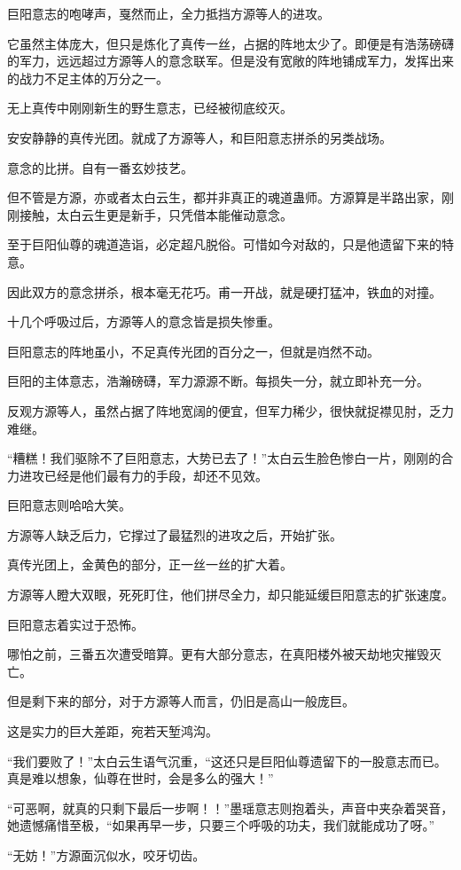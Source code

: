 \begin{this_body}
巨阳意志的咆哮声，戛然而止，全力抵挡方源等人的进攻。

它虽然主体庞大，但只是炼化了真传一丝，占据的阵地太少了。即便是有浩荡磅礴的军力，远远超过方源等人的意念联军。但是没有宽敞的阵地铺成军力，发挥出来的战力不足主体的万分之一。

无上真传中刚刚新生的野生意志，已经被彻底绞灭。

安安静静的真传光团。就成了方源等人，和巨阳意志拼杀的另类战场。

意念的比拼。自有一番玄妙技艺。

但不管是方源，亦或者太白云生，都并非真正的魂道蛊师。方源算是半路出家，刚刚接触，太白云生更是新手，只凭借本能催动意念。

至于巨阳仙尊的魂道造诣，必定超凡脱俗。可惜如今对敌的，只是他遗留下来的特意。

因此双方的意念拼杀，根本毫无花巧。甫一开战，就是硬打猛冲，铁血的对撞。

十几个呼吸过后，方源等人的意念皆是损失惨重。

巨阳意志的阵地虽小，不足真传光团的百分之一，但就是岿然不动。

巨阳的主体意志，浩瀚磅礴，军力源源不断。每损失一分，就立即补充一分。

反观方源等人，虽然占据了阵地宽阔的便宜，但军力稀少，很快就捉襟见肘，乏力难继。

“糟糕！我们驱除不了巨阳意志，大势已去了！”太白云生脸色惨白一片，刚刚的合力进攻已经是他们最有力的手段，却还不见效。

巨阳意志则哈哈大笑。

方源等人缺乏后力，它撑过了最猛烈的进攻之后，开始扩张。

真传光团上，金黄色的部分，正一丝一丝的扩大着。

方源等人瞪大双眼，死死盯住，他们拼尽全力，却只能延缓巨阳意志的扩张速度。

巨阳意志着实过于恐怖。

哪怕之前，三番五次遭受暗算。更有大部分意志，在真阳楼外被天劫地灾摧毁灭亡。

但是剩下来的部分，对于方源等人而言，仍旧是高山一般庞巨。

这是实力的巨大差距，宛若天堑鸿沟。

“我们要败了！”太白云生语气沉重，“这还只是巨阳仙尊遗留下的一股意志而已。真是难以想象，仙尊在世时，会是多么的强大！”

“可恶啊，就真的只剩下最后一步啊！！”墨瑶意志则抱着头，声音中夹杂着哭音，她遗憾痛惜至极，“如果再早一步，只要三个呼吸的功夫，我们就能成功了呀。”

“无妨！”方源面沉似水，咬牙切齿。


\end{this_body}
